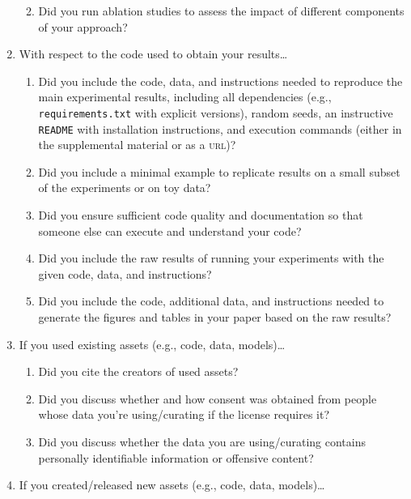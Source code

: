 \documentclass[11pt]{article}
\begin{document}
\begin{enumerate}
\begin{enumerate}
    \answerTODO{}
  \item Did you run ablation studies to assess the impact of different
    components of your approach?
    \answerTODO{}
  \end{enumerate}
\item With respect to the code used to obtain your results\dots
  \begin{enumerate}
\item Did you include the code, data, and instructions needed to reproduce the
    main experimental results, including all dependencies (e.g.,
    \texttt{requirements.txt} with explicit versions), random seeds, an instructive
    \texttt{README} with installation instructions, and execution commands
    (either in the supplemental material or as a \textsc{url})?
    \answerTODO{}
  \item Did you include a minimal example to replicate results on a small subset
    of the experiments or on toy data?
    \answerTODO{}
  \item Did you ensure sufficient code quality and documentation so that someone else
    can execute and understand your code?
    \answerTODO{}
  \item Did you include the raw results of running your experiments with the given
    code, data, and instructions?
    \answerTODO{}
  \item Did you include the code, additional data, and instructions needed to generate
    the figures and tables in your paper based on the raw results?
    \answerTODO{}
  \end{enumerate}
\item If you used existing assets (e.g., code, data, models)\dots
  \begin{enumerate}
  \item Did you cite the creators of used assets?
    \answerTODO{}
  \item Did you discuss whether and how consent was obtained from people whose
    data you're using/curating if the license requires it?
    \answerTODO{}
  \item Did you discuss whether the data you are using/curating contains
    personally identifiable information or offensive content?
    \answerTODO{}
  \end{enumerate}
\item If you created/released new assets (e.g., code, data, models)\dots

\end{enumerate}
\end{document}
